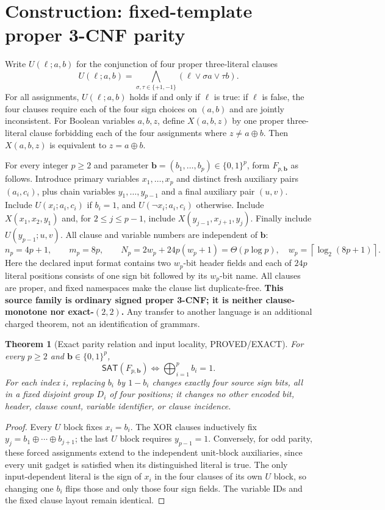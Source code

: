 \documentclass[11pt]{article}
\newtheorem{theorem}{Theorem}
\newcommand{\SAT}{\mathsf{SAT}}
\begin{document}
\section{Construction: fixed-template proper 3-CNF parity}
Write $U(\ell;a,b)$ for the conjunction of four proper three-literal clauses
\[
U(\ell;a,b)=\bigwedge_{\sigma,\tau\in\{+1,-1\}}
  (\ell\lor \sigma a\lor\tau b).
\]
For all assignments, $U(\ell;a,b)$ holds if and only if $\ell$ is true: if $\ell$ is false, the four clauses require each of the four sign choices on $(a,b)$ and are jointly inconsistent.
For Boolean variables $a,b,z$, define $X(a,b,z)$ by one proper three-literal clause forbidding each of the four assignments where $z\ne a\oplus b$. Then $X(a,b,z)$ is equivalent to $z=a\oplus b$.

For every integer $p\ge2$ and parameter $\mathbf b=(b_1,\ldots,b_p)\in\{0,1\}^p$, form $F_{p,\mathbf b}$ as follows. Introduce primary variables $x_1,\ldots,x_p$ and distinct fresh auxiliary pairs $(a_i,c_i)$, plus chain variables $y_1,\ldots,y_{p-1}$ and a final auxiliary pair $(u,v)$. Include $U(x_i;a_i,c_i)$ if $b_i=1$, and $U(\neg x_i;a_i,c_i)$ otherwise. Include $X(x_1,x_2,y_1)$ and, for $2\le j\le p-1$, include $X(y_{j-1},x_{j+1},y_j)$. Finally include $U(y_{p-1};u,v)$. All clause and variable numbers are independent of $\mathbf b$:
\[
 n_p=4p+1,\qquad m_p=8p,\qquad
 N_p=2w_p+24p(w_p+1)=\Theta(p\log p),
 \quad w_p=\left\lceil\log_2(8p+1)\right\rceil.
\]
Here the declared input format contains two $w_p$-bit header fields and each of $24p$ literal positions consists of one sign bit followed by its $w_p$-bit name. All clauses are proper, and fixed namespaces make the clause list duplicate-free. \textbf{This source family is ordinary signed proper 3-CNF; it is neither clause-monotone nor exact-$(2,2)$.} Any transfer to another language is an additional charged theorem, not an identification of grammars.

\begin{theorem}[Exact parity relation and input locality, PROVED/EXACT]
For every $p\ge2$ and $\mathbf b\in\{0,1\}^p$,
\[
\SAT(F_{p,\mathbf b})\iff\bigoplus_{i=1}^p b_i=1.
\]
For each index $i$, replacing $b_i$ by $1-b_i$ changes \emph{exactly four source sign bits}, all in a fixed disjoint group $D_i$ of four positions; it changes no other encoded bit, header, clause count, variable identifier, or clause incidence.
\end{theorem}
\begin{proof}
Every $U$ block fixes $x_i=b_i$. The XOR clauses inductively fix $y_j=b_1\oplus\cdots\oplus b_{j+1}$; the last $U$ block requires $y_{p-1}=1$. Conversely, for odd parity, these forced assignments extend to the independent unit-block auxiliaries, since every unit gadget is satisfied when its distinguished literal is true. The only input-dependent literal is the sign of $x_i$ in the four clauses of its own $U$ block, so changing one $b_i$ flips those and only those four sign fields. The variable IDs and the fixed clause layout remain identical.
\end{proof}
\end{document}
